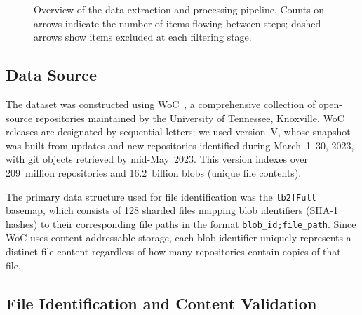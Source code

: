 \documentclass[11pt]{article}
\begin{document}
\begin{figure}[H]
\caption{Overview of the data extraction and processing pipeline. Counts on arrows indicate the number of items flowing between steps; dashed arrows show items excluded at each filtering stage.\label{fig:pipeline}}
\end{figure}

\subsection{Data Source}
\label{sec:data-source}

The dataset was constructed using WoC~\cite{ma2021world}, a comprehensive collection of open-source repositories maintained by the University of Tennessee, Knoxville. WoC releases are designated by sequential letters; we used version~V, whose snapshot was built from updates and new repositories identified during March~1--30, 2023, with git objects retrieved by mid-May~2023. This version indexes over 209~million repositories and 16.2~billion blobs (unique file contents).

The primary data structure used for file identification was the \texttt{lb2fFull} basemap, which consists of 128 sharded files mapping blob identifiers (SHA-1 hashes) to their corresponding file paths in the format \texttt{blob\_id;file\_path}. Since WoC uses content-addressable storage, each blob identifier uniquely represents a distinct file content regardless of how many repositories contain copies of that file.

\subsection{File Identification and Content Validation}
\label{sec:identification-validation}
\end{document}
